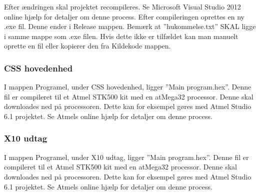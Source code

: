 Efter ændringen skal projektet recompileres. Se Microsoft Visual Studio 2012 online hjælp for detaljer om denne process. Efter compileringen oprettes en ny .exe fil. Denne ender i Release mappen. Bemærk at ''hukommelse.txt'' SKAL ligge i samme mappe som .exe filen. Hvis dette ikke er tilfældet kan man manuelt oprette en fil eller kopierer den fra Kildekode mappen.

\subsubsection{CSS hovedenhed}
I mappen Programel, under CSS hovedenhed, ligger ''Main program.hex''. Denne fil er compileret til et Atmel STK500 kit med en atMega32 processor. Denne skal downloades ned på processoren. Dette kan for eksempel gøres med Atmel Studio 6.1 projektet. Se Atmels online hjælp for detaljer om denne process.

\subsubsection{X10 udtag}
I mappen Programel, under X10 udtag, ligger ''Main program.hex''. Denne fil er compileret til et Atmel STK500 kit med en atMega32 processor. Denne skal downloades ned på processoren. Dette kan for eksempel gøres med Atmel Studio 6.1 projektet. Se Atmels online hjælp for detaljer om denne process.
